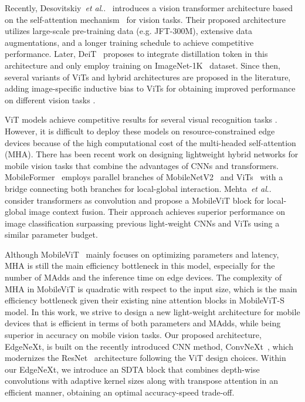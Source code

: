 \documentclass[runningheads]{llncs}
\makeatletter
\DeclareRobustCommand\onedot{\futurelet\@let@token\@onedot}
\def\@onedot{\ifx\@let@token.\else.\null\fi\xspace}
\def\etal{\emph{et al}\onedot}
\makeatother
\begin{document}
Recently, Desovitskiy~\etal~\cite{ViTs} introduces a vision transformer architecture based on the self-attention mechanism~\cite{attention} for vision tasks. Their proposed architecture utilizes large-scale pre-training data (e.g. JFT-300M), extensive data augmentations, and a longer training schedule to achieve competitive performance.
Later, DeiT~\cite{DeiT} proposes to integrate distillation token in this architecture and only employ training on ImageNet-1K~\cite{imagenet} dataset. Since then, several variants of ViTs and hybrid architectures are proposed in the literature, adding image-specific inductive bias to ViTs for obtaining improved performance on different vision tasks \cite{BoTNet,convit,ViT-C,elsa,mvit2021}. 

ViT models achieve competitive results for several visual recognition tasks \cite{ViTs,liu2021swin}. However, it is difficult to deploy these models on resource-constrained edge devices because of the high computational cost of the multi-headed self-attention (MHA). There has been recent work on designing lightweight hybrid networks for mobile vision tasks that combine the advantages of CNNs and transformers. MobileFormer~\cite{MobileFormer} employs parallel branches of MobileNetV2~\cite{MobileNetV2} and ViTs~\cite{ViTs} with a bridge connecting both branches for local-global interaction. Mehta~\etal~\cite{MobileViT} consider transformers as convolution and propose a MobileViT block for local-global image context fusion. Their approach achieves superior performance on image classification surpassing previous light-weight CNNs and ViTs using a similar parameter budget. 

Although MobileViT~\cite{MobileViT} mainly focuses on optimizing parameters and latency, MHA is still the main efficiency bottleneck in this model, especially for the number of MAdds and the inference time on edge devices. The complexity of MHA in MobileViT is quadratic with respect to the input size, which is the main efficiency bottleneck given their existing nine attention blocks in MobileViT-S model. 
In this work, we strive to design a new light-weight architecture for mobile devices that is efficient in terms of both parameters and MAdds, while being superior in accuracy on mobile vision tasks.
Our proposed architecture, EdgeNeXt, is built on the recently introduced CNN method, ConvNeXt~\cite{ConvNeXt}, which modernizes the ResNet~\cite{resnet} architecture following the ViT design choices.
Within our EdgeNeXt, we introduce an SDTA block that combines depth-wise convolutions with adaptive kernel sizes along with transpose attention in an efficient manner, obtaining an optimal accuracy-speed trade-off. 
\end{document}
